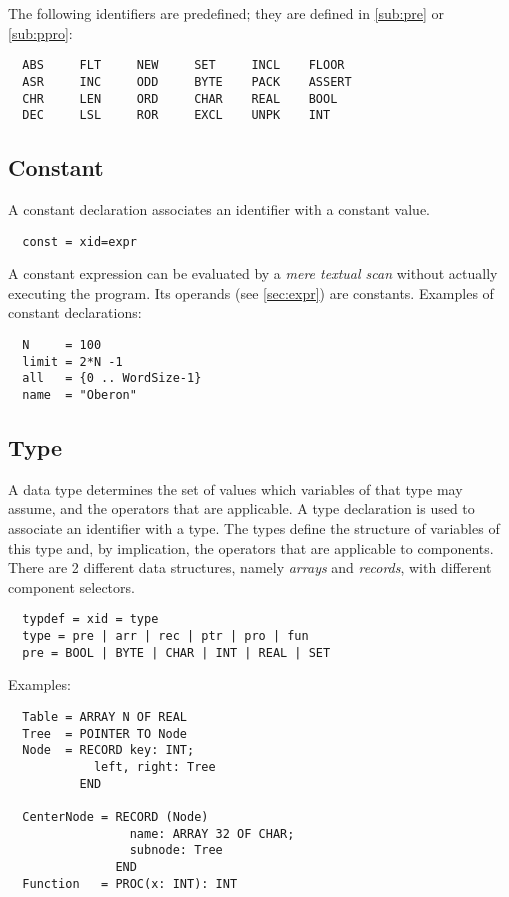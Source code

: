 The following identifiers are predefined; they are defined in \ref{sub:pre} or \ref{sub:ppro}:
\begin{verbatim}
  ABS     FLT     NEW     SET     INCL    FLOOR
  ASR     INC     ODD     BYTE    PACK    ASSERT 
  CHR     LEN     ORD     CHAR    REAL    BOOL
  DEC     LSL     ROR     EXCL    UNPK    INT
\end{verbatim}

\subsection{Constant}
A constant declaration associates an identifier with a constant value.
\begin{verbatim}
  const = xid=expr
\end{verbatim}

A constant expression can be evaluated by a \emph{mere textual scan} without actually executing
the program. Its operands (see \ref{sec:expr}) are constants. Examples of constant declarations:
\begin{verbatim}
  N     = 100
  limit = 2*N -1
  all   = {0 .. WordSize-1}
  name  = "Oberon"
\end{verbatim}

\subsection{Type}
\label{sub:typ}
A data type determines the set of values which variables of that type may assume, and the
operators that are applicable. A type declaration is used to associate an identifier with
a type. The types define the structure of variables of this type and, by implication, the
operators that are applicable to components. There are 2 different data structures, namely
\emph{arrays} and \emph{records}, with different component selectors.
\begin{verbatim}
  typdef = xid = type
  type = pre | arr | rec | ptr | pro | fun
  pre = BOOL | BYTE | CHAR | INT | REAL | SET
\end{verbatim}
Examples:
\begin{verbatim}
  Table = ARRAY N OF REAL
  Tree  = POINTER TO Node
  Node  = RECORD key: INT;
            left, right: Tree
          END
 
  CenterNode = RECORD (Node)
                 name: ARRAY 32 OF CHAR;
                 subnode: Tree
               END
  Function   = PROC(x: INT): INT
\end{verbatim}


